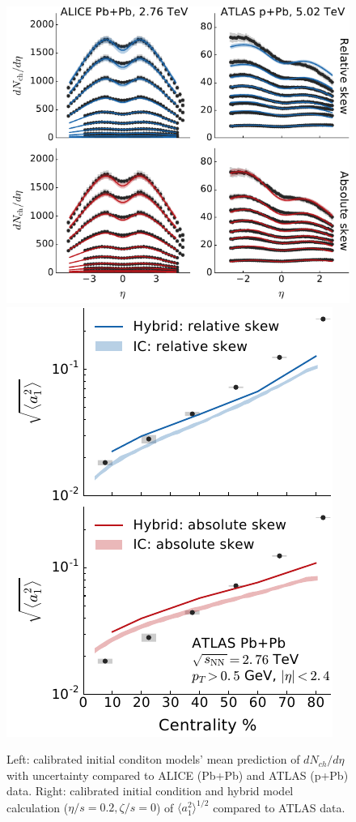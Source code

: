 \documentclass[3p,times,twocolumn]{elsarticle}
\begin{document}
\begin{center}
\begin{figure}
\includegraphics[scale=0.86]{chg_particle_rapidity.pdf}
\hfill
\includegraphics[scale=0.86]{fw_correlation_a1.pdf}
\caption{
	\label{fig:calibrate}
	Left: calibrated initial conditon models' mean prediction of $dN_{ch}/d\eta$ with uncertainty compared to ALICE (Pb+Pb) and ATLAS (p+Pb) data. Right: calibrated initial condition and hybrid model calculation ($\eta/s=0.2, \zeta/s=0$) of $\langle a_1^2\rangle^{1/2}$ compared to ATLAS data.
	}
\end{figure}
\end{center}
\end{document}
